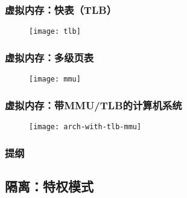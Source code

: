 \begin{frame}
	
	\frametitle{虚拟内存：快表（TLB）}
	
	\begin{figure}
		\centering
		\texttt{[image: tlb]}
	\end{figure}
	
\end{frame}

\begin{frame}[plain]
	
	\frametitle{虚拟内存：多级页表}
	
	\begin{figure}
		\centering
		\texttt{[image: mmu]}
	\end{figure}
	
\end{frame}

\begin{frame}[plain]
	
	\frametitle{虚拟内存：带MMU/TLB的计算机系统}
	
	\begin{figure}
		\centering
		\texttt{[image: arch-with-tlb-mmu]}
	\end{figure}
	
\end{frame}

\begin{frame}
    \frametitle{提纲} 
    \tableofcontents 
\end{frame}

\subsection{隔离：特权模式}

